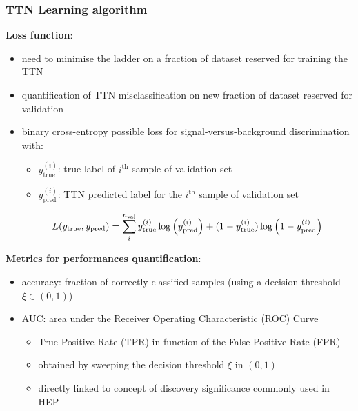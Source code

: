 \documentclass[xcolor=table,8pt]{beamer}
\begin{document}
    
    \begin{frame}[t]
        \frametitle{TTN Learning algorithm}
        
        \textbf{Loss function}:
        \begin{itemize}
            \item need to minimise the ladder on a fraction of dataset reserved for training the TTN
            \item quantification of TTN misclassification on new fraction of dataset reserved for validation
            \item \alert{binary cross-entropy} possible loss for signal-versus-background discrimination with:
            \begin{itemize}
                \item \( y_{\text{true}}^{(i)} \): true label of \( i^{\text{th}} \) sample of validation set
                \item \( y_{\text{pred}}^{(i)} \): TTN predicted label for the \( i^{\text{th}} \) sample of validation set
            \end{itemize}
            \begin{equation}
                L(y_{\text{true}}, y_{\text{pred}})
                =
                \sum_{i}^{n_{\text{val}}}
                y_{\text{true}}^{(i)} \log\qty(y_{\text{pred}}^{(i)}) + (1-y_{\text{true}}^{(i)}) \log\qty(1 - y_{\text{pred}}^{(i)})
            \end{equation}
        \end{itemize}
        
        \medskip
        \textbf{Metrics for performances quantification}:
        \begin{itemize}
            \item \alert{accuracy}: fraction of correctly classified samples (using a decision threshold \( \xi \in (0,1) \))
            \item \alert{AUC}: area under the Receiver Operating Characteristic (ROC) Curve
            \begin{itemize}
                \item True Positive Rate (TPR) in function of the False Positive Rate (FPR)
                \item obtained by sweeping the decision threshold \( \xi \) in \( (0,1) \)
                \item directly linked to concept of discovery significance commonly used in HEP
            \end{itemize}
        \end{itemize}
        

\end{frame}
\end{document}
